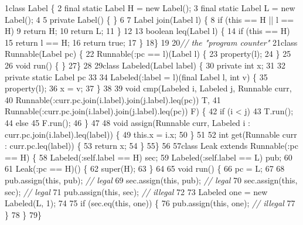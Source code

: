 \begin{tightcode}
\quad\num{1}class Label \{
\quad\num{2}    final static Label H = new Label();
\quad\num{3}    final static Label L = new Label();
\quad\num{4}
\quad\num{5}    private Label() \{ \}
\quad\num{6}
\quad\num{7}    Label join(Label l) \{
\quad\num{8}        if (this == H || l == H)
\quad\num{9}            return H;
\quad\num{10}        return L;
\quad\num{11}    \}
\quad\num{12}
\quad\num{13}    boolean leq(Label l) \{
\quad\num{14}        if (this == H)
\quad\num{15}            return l == H;
\quad\num{16}        return true;
\quad\num{17}    \}
\quad\num{18}\}
\quad\num{19}
\quad\num{20}\emph{// the "program counter"}
\quad\num{21}class Runnable(Label pc) \{
\quad\num{22}    Runnable(:pc == l)(Label l) \{
\quad\num{23}        property(l);
\quad\num{24}    \}
\quad\num{25}
\quad\num{26}    void run() \{ \}
\quad\num{27}\}
\quad\num{28}
\quad\num{29}class Labeled(Label label) \{
\quad\num{30}    private int x;
\quad\num{31}
\quad\num{32}    private static Label pc
\quad\num{33}
\quad\num{34}    Labeled(:label = l)(final Label l, int v) \{
\quad\num{35}        property(l);
\quad\num{36}        x = v;
\quad\num{37}    \}
\quad\num{38}
\quad\num{39}    void cmp(Labeled i, Labeled j, Runnable curr,
\quad\num{40}             Runnable(:curr.pc.join(i.label).join(j.label).leq(pc)) T,
\quad\num{41}             Runnable(:curr.pc.join(i.label).join(j.label).leq(pc)) F) \{
\quad\num{42}        if (i < j) 
\quad\num{43}            T.run();
\quad\num{44}        else
\quad\num{45}            F.run();
\quad\num{46}    \}
\quad\num{47}
\quad\num{48}    void assign(Runnable curr, Labeled i : curr.pc.join(i.label).leq(label)) \{
\quad\num{49}        this.x = i.x;
\quad\num{50}    \}
\quad\num{51}
\quad\num{52}    int get(Runnable curr : curr.pc.leq(label)) \{
\quad\num{53}        return x;
\quad\num{54}    \}
\quad\num{55}\}
\quad\num{56}
\quad\num{57}class Leak extends Runnable(:pc == H) \{
\quad\num{58}    Labeled(:self.label == H) sec;
\quad\num{59}    Labeled(:self.label == L) pub;
\quad\num{60}
\quad\num{61}    Leak(:pc == H)() \{
\quad\num{62}        super(H);
\quad\num{63}    \}
\quad\num{64}
\quad\num{65}    void run() \{
\quad\num{66}        pc = L;
\quad\num{67}
\quad\num{68}        pub.assign(this, pub); \emph{// legal}
\quad\num{69}        sec.assign(this, pub); \emph{// legal}
\quad\num{70}        sec.assign(this, sec); \emph{// legal}
\quad\num{71}        pub.assign(this, sec); \emph{// illegal}
\quad\num{72}
\quad\num{73}        Labeled one = new Labeled(L, 1);
\quad\num{74}
\quad\num{75}        if (sec.eq(this, one)) \{
\quad\num{76}            pub.assign(this, one); \emph{// illegal}
\quad\num{77}        \}
\quad\num{78}    \}
\quad\num{79}\}
\end{tightcode}
